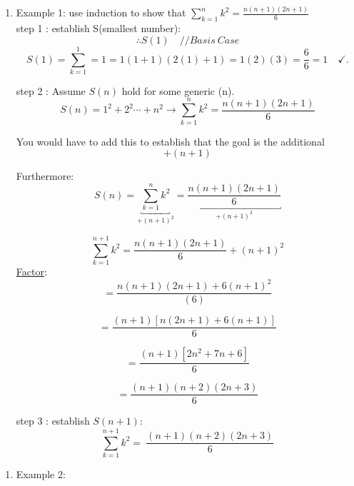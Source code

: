\documentclass[10pt,letterpaper]{article}
\begin{document}
{
\begin{enumerate}
\item[]
    Example 1: use induction to show that $\sum \limits_{k = 1}^{n} k^{2} = \frac{n(n+1)(2n+1)}{6}$\\
    step 1 : establish S(smallest number): $$\therefore S(1) \quad //Basis \ Case$$
    $$S(1) = \sum \limits_{k=1}^{1} = 1 = 1(1+1)(2(1) +1) = 1(2)(3) = \frac{6}{6} = 1 \quad \checkmark.$$

    step 2 : Assume $S(n)$ hold for some generic (n).
    $$S(n) = 1^{2} + 2^{2} \cdots + n^{2} \rightarrow \sum^{n}_{k=1} k^{2} = \frac{n(n+1)(2n+1)}{6}$$
    \begin{center}
         You would have to add this to establish that the goal is the additional {$$+(n+1)$$}
    \end{center}
    Furthermore:
    $$ S(n)= \underbracket{\sum^{n}_{k=1} k^{2}}_{\boxed{+ (n+1)^{2}}} = \underbracket{\frac{n(n+1)(2n+1)}{6}}_{\boxed{+ (n+1)^{2}}}$$
    
    $$\sum^{n+1}_{k=1} k^{2} = \frac{n(n+1)(2n+1)}{6} + (n+1)^{2} $$
    \underline{Factor}: 
    $$ = \frac{n(n+1)(2n+1)+6(n+1)^{2}}{(6)} $$
    
    $$ = \frac{(n+1) \left[ n(2n+1) + 6(n+1) \right]}{6}$$
    
    $$ = \frac{ (n+1)\left[ 2n^{2} + 7n + 6 \right]}{6}$$
    
    $$ = \frac{ (n+1)(n+2)(2n+3) } {6} $$
    
    step 3 : establish $S(n+1)$: $$ \sum^{n+1}_{k=1} k^{2} = \ \frac{(n+1)(n+2)(2n+3)}{6}$$
\end{enumerate}

\newpage{}
\begin{enumerate}
    \item [] Example 2: 
\end{enumerate}{}
}
\end{document}
